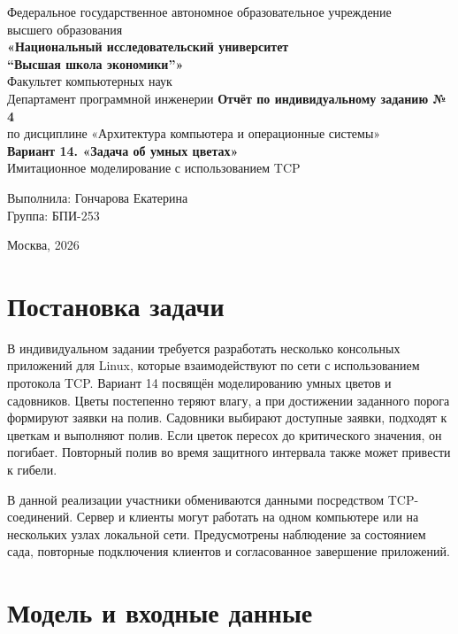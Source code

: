 \documentclass[12pt,a4paper]{article}
\begin{document}
\begin{titlepage}
\begin{center}
Федеральное государственное автономное образовательное учреждение\\
высшего образования\\[2mm]
\textbf{«Национальный исследовательский университет\\
``Высшая школа экономики''»}\\[3mm]
Факультет компьютерных наук\\
Департамент программной инженерии
\vfill
{\Large\bfseries Отчёт по индивидуальному заданию № 4}\\[4mm]
{\large по дисциплине «Архитектура компьютера и операционные системы»}\\[7mm]
{\Large\bfseries Вариант 14. «Задача об умных цветах»}\\[3mm]
{\large Имитационное моделирование с использованием TCP}
\vfill
\begin{flushright}
Выполнила: Гончарова Екатерина\\
Группа: БПИ-253
\end{flushright}
\vfill
Москва, 2026
\end{center}
\end{titlepage}
\tableofcontents
\newpage

\section{Постановка задачи}
В индивидуальном задании требуется разработать несколько консольных приложений для Linux, которые взаимодействуют по сети с использованием протокола TCP. Вариант 14 посвящён моделированию умных цветов и садовников. Цветы постепенно теряют влагу, а при достижении заданного порога формируют заявки на полив. Садовники выбирают доступные заявки, подходят к цветкам и выполняют полив. Если цветок пересох до критического значения, он погибает. Повторный полив во время защитного интервала также может привести к гибели.

В данной реализации участники обмениваются данными посредством TCP-соединений. Сервер и клиенты могут работать на одном компьютере или на нескольких узлах локальной сети. Предусмотрены наблюдение за состоянием сада, повторные подключения клиентов и согласованное завершение приложений.

\section{Модель и входные данные}
\end{document}
